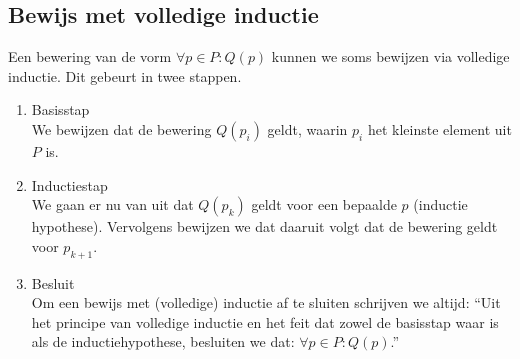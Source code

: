 \documentclass[lineaire_algebra_oplossingen.tex]{subfiles}
\begin{document}
\subsection{Bewijs met volledige inductie}
Een bewering van de vorm $\forall p \in P: Q(p)$ kunnen we soms bewijzen via volledige inductie. Dit gebeurt in twee stappen.
\begin{enumerate}
\item Basisstap\\
We bewijzen dat de bewering $Q(p_i)$ geldt, waarin $p_i$ het kleinste element uit $P$ is.
\item Inductiestap\\
We gaan er nu van uit dat $Q(p_k)$ geldt voor een bepaalde $p$ (inductie hypothese). Vervolgens bewijzen we dat daaruit volgt dat de bewering geldt voor $p_{k+1}$.
\item Besluit \\
Om een bewijs met (volledige) inductie af te sluiten schrijven we altijd: ``Uit het principe van volledige inductie en het feit dat zowel de basisstap waar is als de inductiehypothese, besluiten we dat: $\forall p\in P: Q(p)$.''
\end{enumerate}
\end{document}
